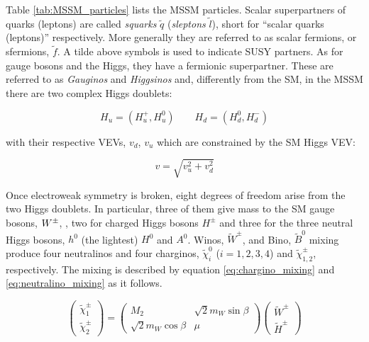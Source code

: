 			\noindent Table \ref{tab:MSSM_particles} lists the MSSM particles. Scalar superpartners of quarks (leptons) are called \emph{squarks} $\tilde{q}$ (\emph{sleptons} $\tilde{l}$), short for ``scalar quarks (leptons)'' respectively. More generally they are referred to as scalar fermions, or sfermions, $\tilde{f}$. A tilde above symbols is used to indicate SUSY partners. As for gauge bosons and the Higgs, they have a fermionic superpartner. These are referred to as \emph{Gauginos} and \emph{Higgsinos} and, differently from the SM, in the MSSM there are two complex Higgs doublets: 

			\begin{equation*}
				H_u = (H_u^+, H_u^0) \qquad H_d = (H_d^0, H_d^-) 
				\label{eq:MSSM_HiggsDoublets}
			\end{equation*}

			\noindent with their respective VEVs, $v_d$, $v_u$ which are constrained by the SM Higgs VEV: 

			\begin{equation*}
				v = \sqrt{v_u^2 + v_d^2}
				\label{eq:MSSM_HiggsVEVs}
			\end{equation*}

			\noindent Once electroweak symmetry is broken, eight degrees of freedom arise from the two Higgs doublets. In particular, three of them give mass to the SM gauge bosons, $W^{\pm}$, \Zboson, two for charged Higgs bosons $H^{\pm}$ and three for the three neutral Higgs bosons, $h^0$ (the lightest) $H^0$ and $A^0$. Winos, $\tilde{W}^{\pm}$, and Bino, $\tilde{B}^0$ mixing produce four neutralinos and four charginos, $\tilde{\chi}^0_i$ ($i=1,2,3,4$) and $\tilde{\chi}^{\pm}_{1,2}$, respectively. The mixing is described by equation \ref{eq:chargino_mixing} and \ref{eq:neutralino_mixing} as it follows.

			\begin{equation}
			\label{eq:chargino_mixing}
					\begin{pmatrix}  \tilde{\chi}^{\pm}_1 \\ \tilde{\chi}^{\pm}_2 \end{pmatrix}	
					= 
					\begin{pmatrix}
						M_2 & \sqrt{2} m_W \sin \beta \\
						\sqrt{2} m_W \cos \beta & \mu  
					\end{pmatrix}
					\begin{pmatrix}
						\tilde{W}^{\pm} \\
						\tilde{H}^{\pm}
					\end{pmatrix}
			\end{equation}

